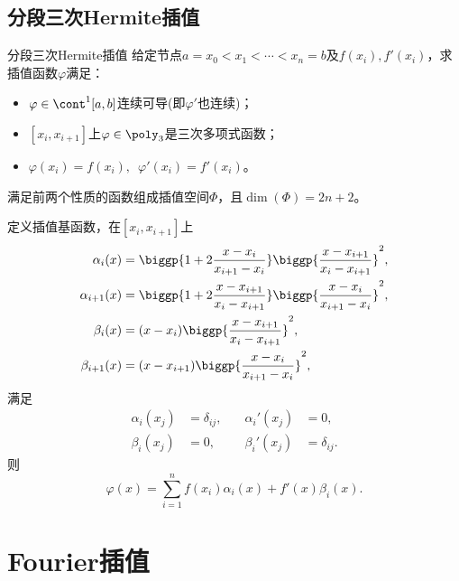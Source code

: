 \subsection{分段三次Hermite插值}

\begin{definition}
    {分段三次Hermite插值}{}
    给定节点$a=x_0<x_1<\cdots<x_n=b$及$f(x_i),f'(x_i)$，求插值函数$\varphi$满足：
    \begin{itemize}
        \item $\varphi\in\cont^1[a,b]$连续可导(即$\varphi'$也连续)；
        \item $[x_i,x_{i+1}]$上$\varphi\in\poly_3$是三次多项式函数；
        \item $\varphi(x_i)=f(x_i),\enspace\varphi'(x_i)=f'(x_i)$。
    \end{itemize}
    满足前两个性质的函数组成插值空间$\Phi$，且$\dim(\Phi)=2n+2$。
\end{definition}

定义插值基函数，在$[x_i,x_{i+1}]$上
\begin{subequations}
    \begin{align}
        \alpha_i(x)&=\biggp{1+2\frac{x-x_i}{x_{i+1}-x_i}}\biggp{\frac{x-x_{i+1}}{x_i-x_{i+1}}}^2,\\
        \alpha_{i+1}(x)&=\biggp{1+2\frac{x-x_{i+1}}{x_i-x_{i+1}}}\biggp{\frac{x-x_i}{x_{i+1}-x_i}}^2,\\
        \beta_i(x)&=(x-x_i)\biggp{\frac{x-x_{i+1}}{x_i-x_{i+1}}}^2,\\
        \beta_{i+1}(x)&=(x-x_{i+1})\biggp{\frac{x-x_i}{x_{i+1}-x_i}}^2,
    \end{align}
\end{subequations}
满足
\begin{subequations}
    \begin{alignat}{2}
        \alpha_i(x_j)&=\delta_{ij},\quad&\alpha_i'(x_j)&=0,\\
        \beta_i(x_j)&=0,&\beta_i'(x_j)&=\delta_{ij}.
    \end{alignat}
\end{subequations}
则
\begin{equation}
    \varphi(x)=\sum_{i=1}^nf(x_i)\alpha_i(x)+f'(x)\beta_i(x).
\end{equation}

\section{Fourier插值}
\label{sec:Fourier interpolation}

